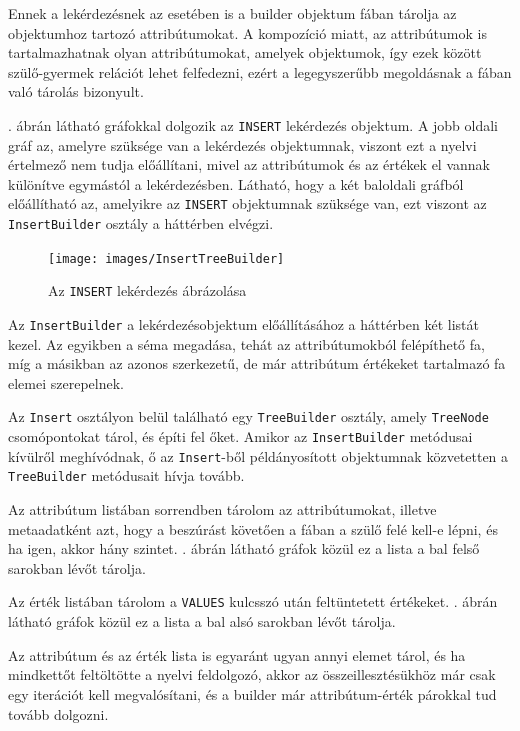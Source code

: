 Ennek a lekérdezésnek az esetében is a builder objektum fában tárolja az objektumhoz tartozó attribútumokat. A kompozíció miatt, az attribútumok is tartalmazhatnak olyan attribútumokat, amelyek objektumok, így ezek között szülő-gyermek relációt lehet felfedezni, ezért a legegyszerűbb megoldásnak a fában való tárolás bizonyult.

. ábrán látható gráfokkal dolgozik az \texttt{INSERT} lekérdezés objektum. A jobb oldali gráf az, amelyre szüksége van a lekérdezés objektumnak, viszont ezt a nyelvi értelmező nem tudja előállítani, mivel az attribútumok és az értékek el vannak különítve egymástól a lekérdezésben. Látható, hogy a két baloldali gráfból előállítható az, amelyikre az \texttt{INSERT} objektumnak szüksége van, ezt viszont az \texttt{InsertBuilder} osztály a háttérben elvégzi.

\begin{figure}[htb]
	\begin{center}
		\texttt{[image: images/InsertTreeBuilder]}
		\caption{Az \texttt{INSERT} lekérdezés ábrázolása}
		\label{fig:insertTreeBuilder}
	\end{center}
\end{figure}

Az \texttt{InsertBuilder} a lekérdezésobjektum előállításához a háttérben két listát kezel. Az egyikben a séma megadása, tehát az attribútumokból felépíthető fa, míg a másikban az azonos szerkezetű, de már attribútum értékeket tartalmazó fa elemei szerepelnek.

Az \texttt{Insert} osztályon belül található egy \texttt{TreeBuilder} osztály, amely \texttt{TreeNode} csomópontokat tárol, és építi fel őket.
Amikor az \texttt{InsertBuilder} metódusai kívülről meghívódnak, ő az \texttt{Insert}-ből példányosított objektumnak közvetetten a \texttt{TreeBuilder} metódusait hívja tovább.

Az attribútum listában sorrendben tárolom az attribútumokat, illetve metaadatként azt, hogy a beszúrást követően a fában a szülő felé kell-e lépni, és ha igen, akkor hány szintet. . ábrán látható gráfok közül ez a lista a bal felső sarokban lévőt tárolja.

Az érték listában tárolom a \texttt{VALUES} kulcsszó után feltüntetett értékeket. . ábrán látható gráfok közül ez a lista a bal alsó sarokban lévőt tárolja.


Az attribútum és az érték lista is egyaránt ugyan annyi elemet tárol, és ha mindkettőt feltöltötte a nyelvi feldolgozó, akkor az összeillesztésükhöz már csak egy iterációt kell megvalósítani, és a builder már attribútum-érték párokkal tud tovább dolgozni.


